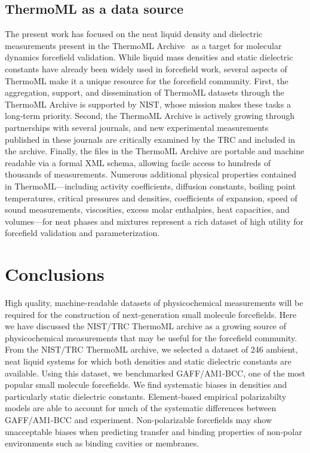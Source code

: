 \documentclass[aip, jcp, reprint]{revtex4-1}  %
\begin{document}
\subsection{ThermoML as a data source}

The present work has focused on the neat liquid density and dielectric measurements present in the ThermoML Archive~\cite{frenkel2006xml, frenkel2003thermoml, chirico2003thermoml} as a target for molecular dynamics forcefield validation.  
While liquid mass densities and static dielectric constants have already been widely used in forcefield work, several aspects of ThermoML make it a unique resource for the forcefield community.  
First, the aggregation, support, and dissemination of ThermoML datasets through the ThermoML Archive is supported by NIST, whose mission makes these tasks a long-term priority.  
Second, the ThermoML Archive is actively growing through partnerships with several journals, and new experimental measurements published in these journals are critically examined by the TRC and included in the archive.  
Finally, the files in the ThermoML Archive are portable and machine readable via a formal XML schema, allowing facile access to hundreds of thousands of measurements.  
Numerous additional physical properties contained in ThermoML---including activity coefficients, diffusion constants, boiling point temperatures, critical pressures and densities, coefficients of expansion, speed of sound measurements, viscosities, excess molar enthalpies, heat capacities, and volumes---for neat phases and mixtures represent a rich dataset of high utility for forcefield validation and parameterization.


\section{Conclusions}

High quality, machine-readable datasets of physicochemical measurements will be required for the construction of next-generation small molecule forcefields.  
Here we have discussed the NIST/TRC ThermoML archive as a growing source of physicochemical measurements that may be useful for the forcefield community.
From the NIST/TRC ThermoML archive, we selected a dataset of 246 ambient, neat liquid systems for which both densities and static dielectric constants are available.  
Using this dataset, we benchmarked GAFF/AM1-BCC, one of the most popular small molecule forcefields.
We find systematic biases in densities and particularly static dielectric constants.
Element-based empirical polarizabilty models are able to account for much of the systematic differences between GAFF/AM1-BCC and experiment.  
Non-polarizable forcefields may show unacceptable biases when predicting transfer and binding properties of non-polar environments such as binding cavities or membranes.  
\end{document}
